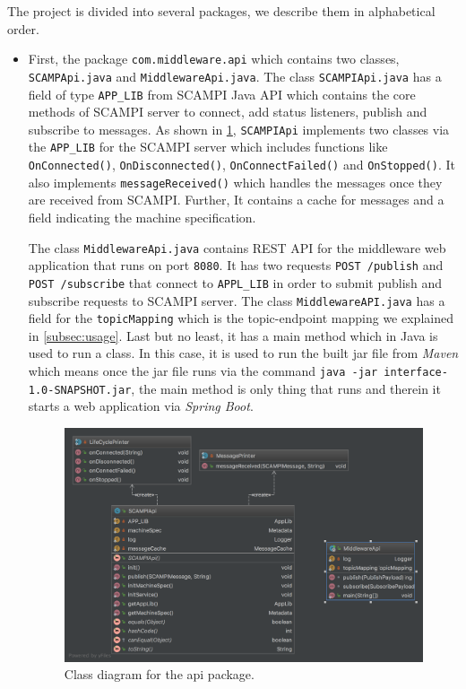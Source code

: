  \noindent The project is divided into several packages, we describe them in alphabetical order.
 \begin{itemize}
 
  \item First, the package \verb|com.middleware.api| which contains two classes, \verb|SCAMPApi.java|  and \verb|MiddlewareApi.java|. The class \verb|SCAMPIApi.java| has a field of type \verb|APP_LIB| from SCAMPI Java API which contains the core methods of SCAMPI server to connect, add status listeners, publish and subscribe to messages.  As shown in \ref{fig:cd-api}, \verb|SCAMPIApi| implements two classes via the \verb|APP_LIB| for the SCAMPI server which includes functions like \verb|OnConnected()|, \verb|OnDisconnected()|, \verb|OnConnectFailed()| and \verb|OnStopped()|. It also implements \verb|messageReceived()| which handles the messages once they are received from SCAMPI. Further, It contains a cache for messages and a field indicating the machine specification.
 
The class \verb|MiddlewareApi.java| contains REST API for the middleware web application that runs on port \verb|8080|. It has two requests \verb|POST /publish| and \verb|POST /subscribe|  that connect to  \verb|APPL_LIB| in order to submit publish and subscribe requests to SCAMPI server. The class \verb|MiddlewareAPI.java| has a field for the \verb|topicMapping| which is the topic-endpoint mapping we explained in \ref{subsec:usage}. Last but no least, it has a main method which in Java is used to run a class. In this case, it is used to run the built  jar file from \textit{Maven} which means once the jar file runs via the command \verb|java -jar interface-1.0-SNAPSHOT.jar|, the main method is only thing that runs and therein it starts a web application via \textit{Spring Boot}.
 \begin{figure}[H]
 	\centering
 	\includegraphics[scale=0.2]{images/cd-api.png}
 	\caption{Class diagram for the api package. }
 	\label{fig:cd-api}
 \end{figure}
 

\end{itemize}
